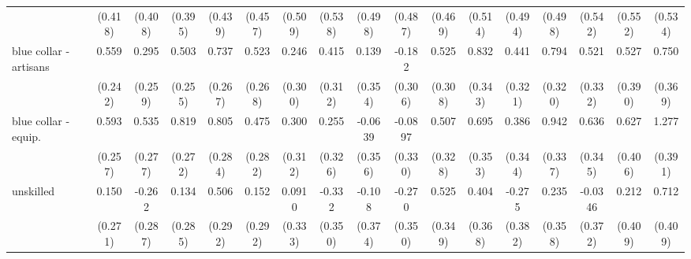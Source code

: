 {\begin{tabular}{l*{16}{c}}
                    &     (0.418)         &     (0.408)         &     (0.395)         &     (0.439)         &     (0.457)         &     (0.509)         &     (0.538)         &     (0.498)         &     (0.487)         &     (0.469)         &     (0.514)         &     (0.494)         &     (0.498)         &     (0.542)         &     (0.552)         &     (0.534)         \\
[1em]
blue collar - artisans&       0.559\sym{*}  &       0.295         &       0.503\sym{*}  &       0.737\sym{**} &       0.523         &       0.246         &       0.415         &       0.139         &      -0.182         &       0.525         &       0.832\sym{*}  &       0.441         &       0.794\sym{*}  &       0.521         &       0.527         &       0.750\sym{*}  \\
                    &     (0.242)         &     (0.259)         &     (0.255)         &     (0.267)         &     (0.268)         &     (0.300)         &     (0.312)         &     (0.354)         &     (0.306)         &     (0.308)         &     (0.343)         &     (0.321)         &     (0.320)         &     (0.332)         &     (0.390)         &     (0.369)         \\
[1em]
blue collar - equip.&       0.593\sym{*}  &       0.535         &       0.819\sym{**} &       0.805\sym{**} &       0.475         &       0.300         &       0.255         &     -0.0639         &     -0.0897         &       0.507         &       0.695\sym{*}  &       0.386         &       0.942\sym{**} &       0.636         &       0.627         &       1.277\sym{**} \\
                    &     (0.257)         &     (0.277)         &     (0.272)         &     (0.284)         &     (0.282)         &     (0.312)         &     (0.326)         &     (0.356)         &     (0.330)         &     (0.328)         &     (0.353)         &     (0.344)         &     (0.337)         &     (0.345)         &     (0.406)         &     (0.391)         \\
[1em]
unskilled           &       0.150         &      -0.262         &       0.134         &       0.506         &       0.152         &      0.0910         &      -0.332         &      -0.108         &      -0.270         &       0.525         &       0.404         &      -0.275         &       0.235         &     -0.0346         &       0.212         &       0.712         \\
                    &     (0.271)         &     (0.287)         &     (0.285)         &     (0.292)         &     (0.292)         &     (0.333)         &     (0.350)         &     (0.374)         &     (0.350)         &     (0.349)         &     (0.368)         &     (0.382)         &     (0.358)         &     (0.372)         &     (0.409)         &     (0.409)         \\

\end{tabular}}
